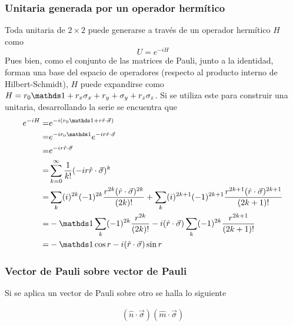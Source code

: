\subsubsection{Unitaria generada por un operador hermítico}
Toda unitaria de $2\times 2$ puede generarse a través de un operador hermítico $H$ como
\begin{equation*}
    U=e^{-iH}
\end{equation*}
Pues bien, como el conjunto de las matrices de Pauli, junto a la identidad, forman una base del espacio de operadores (respecto al producto interno de Hilbert-Schmidt), $H$ puede expandirse como $H=r_{0}\Id+r_{x}\pauli{x}+r_{y}+\pauli{y}+r_{z}\pauli{z}$. Si se utiliza este para construir una unitaria, desarrollando la serie se encuentra que
\begin{align*}
    e^{-iH}=&e^{-i(r_{0}\Id+r\paulivec{r})}\\
    =&e^{-i r_{0}\Id}e^{-ir\paulivec{r}}\\
    =&e^{-ir\paulivec{r}}\\
    =&\sum_{k=0}^{\infty}\frac{1}{k!}(-ir\paulivec{r})^k\\
    =&\sum_{k}(i)^{2k}(-1)^{2k}\frac{r^{2k}(\paulivec{r})^{2k}}{(2k)!}+\sum_{k}(i)^{2k+1}(-1)^{2k+1}\frac{r^{2k+1}(\paulivec{r})^{2k+1}}{(2k+1)!}\\
    =&-\Id\sum_{k}(-1)^{2k}\frac{r^{2k}}{(2k)!}-i(\paulivec{r})\sum_{k}(-1)^{2k}\frac{r^{2k+1}}{(2k+1)!}\\
    =&-\Id \cos{r}-i(\paulivec{r})\sin{r}
\end{align*}
\subsubsection{Vector de Pauli sobre vector de Pauli}
Si se aplica un vector de Pauli sobre otro se halla lo siguiente

\begin{align*}
    (\hat{n}\cdot\vec{\sigma})(\hat{m}\cdot\vec{\sigma})
\end{align*}
